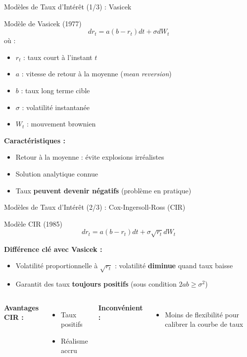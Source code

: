 \documentclass[10pt,aspectratio=169,xcolor={dvipsnames}]{beamer}
\begin{document}
\begin{frame}{Modèles de Taux d'Intérêt (1/3) : Vasicek}
\begin{block}{Modèle de Vasicek (1977)}
\[
dr_t = a(b - r_t)dt + \sigma dW_t
\]
où :
\begin{itemize}
    \item $r_t$ : taux court à l'instant $t$
    \item $a$ : vitesse de retour à la moyenne (\textit{mean reversion})
    \item $b$ : taux long terme cible
    \item $\sigma$ : volatilité instantanée
    \item $W_t$ : mouvement brownien
\end{itemize}
\end{block}

\textbf{Caractéristiques :}
\begin{itemize}
    \item[\checkmark] Retour à la moyenne : évite explosions irréalistes
    \item[\checkmark] Solution analytique connue
    \item[\texttimes] Taux \textbf{peuvent devenir négatifs} (problème en pratique)
\end{itemize}
\end{frame}

\begin{frame}{Modèles de Taux d'Intérêt (2/3) : Cox-Ingersoll-Ross (CIR)}
\begin{block}{Modèle CIR (1985)}
\[
dr_t = a(b - r_t)dt + \sigma \sqrt{r_t} dW_t
\]
\end{block}

\textbf{Différence clé avec Vasicek :}
\begin{itemize}
    \item Volatilité proportionnelle à $\sqrt{r_t}$ : volatilité \textbf{diminue} quand taux baisse
    \item Garantit des taux \textbf{toujours positifs} (sous condition $2ab \geq \sigma^2$)
\end{itemize}

\vspace{0.3cm}
\begin{columns}
\textbf{Avantages CIR :}
\begin{itemize}
    \item[\checkmark] Taux positifs
    \item[\checkmark] Réalisme accru
\end{itemize}

\textbf{Inconvénient :}
\begin{itemize}
    \item[\texttimes] Moins de flexibilité pour calibrer la courbe de taux
\end{itemize}
\end{columns}
\end{frame}
\end{document}
